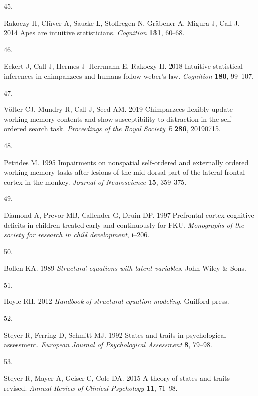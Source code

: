 \documentclass[
  man,floatsintext]{apa6}
\newlength{\cslhangindent}
\newlength{\csllabelwidth}
\newenvironment{CSLReferences}[2] %
 {\begin{list}{}{%
  \setlength{\itemindent}{0pt}
  \setlength{\leftmargin}{0pt}
  \setlength{\parsep}{0pt}
  \ifodd #1
   \setlength{\leftmargin}{\cslhangindent}
   \setlength{\itemindent}{-1\cslhangindent}
  \fi
  \setlength{\itemsep}{#2\baselineskip}}}
 {\end{list}}
\newcommand{\CSLLeftMargin}[1]{\parbox[t]{\csllabelwidth}{\strut#1\strut}}
\newcommand{\CSLRightInline}[1]{\parbox[t]{\linewidth - \csllabelwidth}{\strut#1\strut}}
\begin{document}
\begin{CSLReferences}{0}{1}
\CSLLeftMargin{45. }%
\CSLRightInline{Rakoczy H, Clüver A, Saucke L, Stoffregen N, Gräbener A, Migura J, Call J. 2014 Apes are intuitive statisticians. \emph{Cognition} \textbf{131}, 60--68.}

\CSLLeftMargin{46. }%
\CSLRightInline{Eckert J, Call J, Hermes J, Herrmann E, Rakoczy H. 2018 Intuitive statistical inferences in chimpanzees and humans follow weber's law. \emph{Cognition} \textbf{180}, 99--107.}

\CSLLeftMargin{47. }%
\CSLRightInline{Völter CJ, Mundry R, Call J, Seed AM. 2019 Chimpanzees flexibly update working memory contents and show susceptibility to distraction in the self-ordered search task. \emph{Proceedings of the Royal Society B} \textbf{286}, 20190715.}

\CSLLeftMargin{48. }%
\CSLRightInline{Petrides M. 1995 Impairments on nonspatial self-ordered and externally ordered working memory tasks after lesions of the mid-dorsal part of the lateral frontal cortex in the monkey. \emph{Journal of Neuroscience} \textbf{15}, 359--375.}

\CSLLeftMargin{49. }%
\CSLRightInline{Diamond A, Prevor MB, Callender G, Druin DP. 1997 Prefrontal cortex cognitive deficits in children treated early and continuously for PKU. \emph{Monographs of the society for research in child development}, i--206.}

\CSLLeftMargin{50. }%
\CSLRightInline{Bollen KA. 1989 \emph{Structural equations with latent variables}. John Wiley \& Sons. }

\CSLLeftMargin{51. }%
\CSLRightInline{Hoyle RH. 2012 \emph{Handbook of structural equation modeling}. Guilford press. }

\CSLLeftMargin{52. }%
\CSLRightInline{Steyer R, Ferring D, Schmitt MJ. 1992 States and traits in psychological assessment. \emph{European Journal of Psychological Assessment} \textbf{8}, 79--98.}

\CSLLeftMargin{53. }%
\CSLRightInline{Steyer R, Mayer A, Geiser C, Cole DA. 2015 A theory of states and traits---revised. \emph{Annual Review of Clinical Psychology} \textbf{11}, 71--98.}


\end{CSLReferences}
\end{document}
